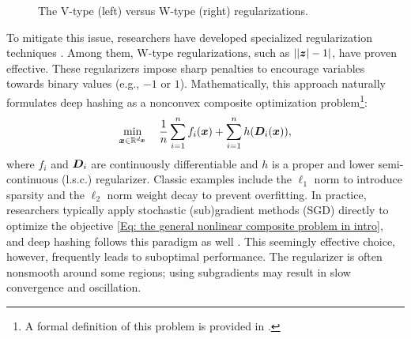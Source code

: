 \begin{figure}[ht]
\centering
{}
\caption{The V-type (left) versus W-type (right) regularizations.}
\label{Fig: the W and V regularizations}
\vspace{-3ex}
\end{figure}
To mitigate this issue, researchers have developed specialized regularization techniques \cite{caoDeepCauchyHashing2018,li2017deep,liuDeepSupervisedHashing}. Among them, W-type regularizations, such as \(| |\bm{z}| - 1| \), have proven effective.
These regularizers impose sharp penalties to encourage variables towards binary values (e.g., $-1$ or $1$). Mathematically, this approach naturally formulates deep hashing as a nonconvex composite optimization problem\footnote{A formal definition of this problem is provided in .}:
\begin{align}
\label{Eq: the general nonlinear composite problem in intro}
\min_{\bm{x} \in \mathbb{R}^{d_{\bm{x}}}} \quad \frac{1}{n} \sum_{i=1}^n f_i (\bm{x}) + \sum_{i=1}^n h(\bm{D}_i(\bm{x})),
\end{align} where \(f_i\) and \(\bm{D}_i\) are continuously differentiable and \(h\) is a proper and lower semi-continuous (l.s.c.) regularizer. Classic examples include the 
\(\ell_1\) norm to introduce sparsity and the \(\ell_2\) norm weight decay to prevent overfitting. In practice, researchers typically apply stochastic (sub)gradient methods (SGD) directly to optimize the objective \eqref{Eq: the general nonlinear composite problem in intro}, and deep hashing follows this paradigm as well \cite{wu2025fth}. This seemingly effective choice, however, frequently leads to suboptimal performance. The regularizer is often nonsmooth around some regions; using subgradients may result in slow convergence and oscillation.

